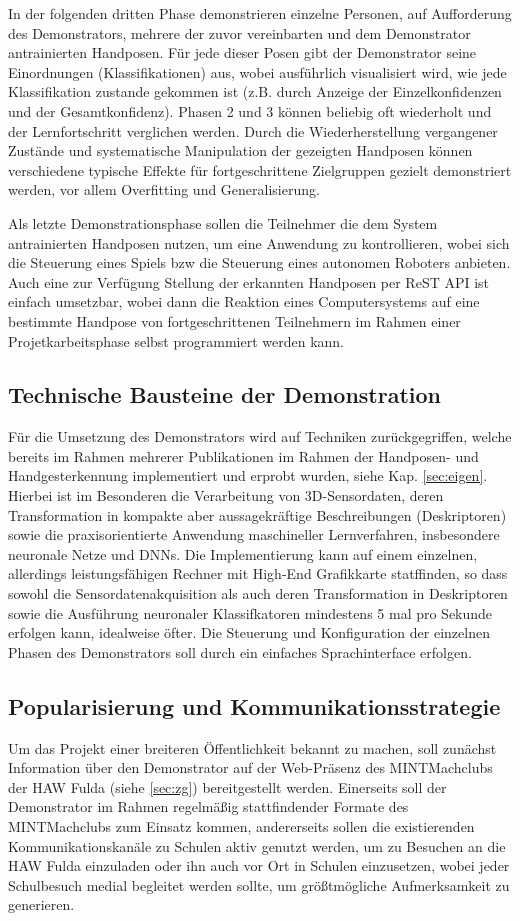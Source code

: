 \documentclass[11pt]{article}
\begin{document}
In der folgenden dritten Phase demonstrieren einzelne Personen, auf Aufforderung des Demonstrators, mehrere der zuvor vereinbarten und dem Demonstrator antrainierten Handposen. Für jede dieser Posen gibt der Demonstrator seine Einordnungen (Klassifikationen) aus, wobei
ausführlich visualisiert wird, wie jede Klassifikation zustande gekommen ist (z.B. durch Anzeige der Einzelkonfidenzen und der Gesamtkonfidenz). Phasen 2 und 3 können beliebig oft wiederholt und der Lernfortschritt verglichen werden. Durch die Wiederherstellung vergangener Zustände und systematische Manipulation der gezeigten Handposen können verschiedene typische Effekte für fortgeschrittene Zielgruppen gezielt demonstriert werden, vor allem Overfitting und Generalisierung.

Als letzte Demonstrationsphase sollen die Teilnehmer die dem System antrainierten Handposen nutzen, um eine Anwendung zu kontrollieren, wobei sich
die Steuerung eines Spiels bzw die Steuerung eines autonomen Roboters anbieten. Auch eine zur Verfügung Stellung der erkannten Handposen per ReST API ist einfach umsetzbar,
wobei dann die Reaktion eines Computersystems auf eine bestimmte Handpose von fortgeschrittenen Teilnehmern im Rahmen einer Projetkarbeitsphase selbst programmiert werden kann.
%
\subsection{Technische Bausteine der Demonstration}
%
Für die Umsetzung des Demonstrators wird auf Techniken zurückgegriffen, welche bereits im Rahmen mehrerer Publikationen im Rahmen der Handposen- und Handgesterkennung implementiert und erprobt wurden, siehe Kap. \ref{sec:eigen}. Hierbei ist im Besonderen die Verarbeitung von 3D-Sensordaten, deren Transformation in kompakte aber aussagekräftige Beschreibungen (Deskriptoren) sowie die praxisorientierte Anwendung maschineller Lernverfahren, insbesondere neuronale Netze und DNNs. Die Implementierung kann auf einem einzelnen, allerdings leistungsfähigen Rechner mit High-End Grafikkarte statffinden, so dass sowohl die Sensordatenakquisition als auch deren Transformation in Deskriptoren sowie die Ausführung neuronaler Klassifkatoren mindestens 5 mal pro Sekunde erfolgen kann, idealweise öfter. Die Steuerung und Konfiguration der einzelnen Phasen des Demonstrators soll durch ein einfaches Sprachinterface erfolgen.
%
\subsection{Popularisierung und Kommunikationsstrategie}
Um das Projekt einer breiteren Öffentlichkeit bekannt zu machen, soll zunächst Information über den Demonstrator auf der Web-Präsenz des MINTMachclubs der HAW Fulda (siehe \ref{sec:zg}) bereitgestellt werden. Einerseits soll der Demonstrator im Rahmen regelmäßig stattfindender Formate des MINTMachclubs zum Einsatz kommen, andererseits sollen die existierenden Kommunikationskanäle zu Schulen aktiv genutzt werden, um zu Besuchen an die HAW Fulda einzuladen oder ihn auch vor Ort in Schulen einzusetzen, wobei jeder Schulbesuch medial begleitet werden sollte, um größtmögliche Aufmerksamkeit zu generieren.
%
\renewcommand{\thesection}{5}
\end{document}
